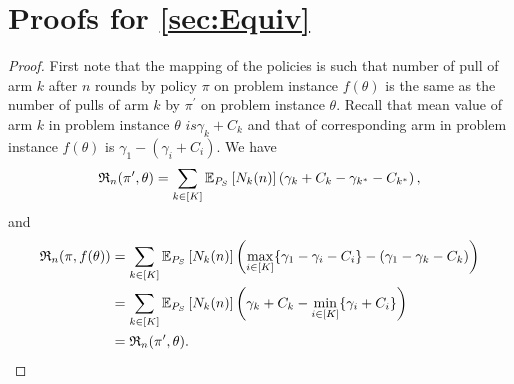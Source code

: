 \section{Proofs for \cref{sec:Equiv}}
\propEquivalence*
\begin{proof}First note that the mapping of the policies is such that number of pull of arm $k$ after $n$ rounds by policy $\pi$ on problem instance $f(\theta)$ is the same as the number of pulls of arm $k$ by $\pi^\prime$ on problem instance $\theta$. Recall that mean value of arm $k$ in problem instance $\theta$ $ is \gamma_k +C_k$ and that of corresponding arm in problem instance $f(\theta)$ is $\gamma_1-(\gamma_i+C_i)$. We have
	\begin{align*}
	\mathfrak{R}_n(\pi^\prime,\theta) = \sum_{k\in [K]} \mathbb{E}_{P_S}\left[N_k(n)\right](\gamma_k+C_k-\gamma_{k^*}-C_{k^*}) \,,
	\end{align*}
	and
	\begin{align*}
	 \mathfrak{R}_n(\pi,f(\theta))
	&= \sum_{k\in [K]} \mathbb{E}_{P_S}\left[N_k(n)\right]\left (\max_{i \in [K]}\{\gamma_1-\gamma_i- C_i\}-(\gamma_1-\gamma_k- C_k)\right) \\
	&= \sum_{k\in [K]} \mathbb{E}_{P_S}\left[N_k(n)\right]\left (\gamma_k+ C_k - \min_{i \in [K]}\{\gamma_i+ C_i\}\right) \\
	&=\mathfrak{R}_n(\pi^\prime,\theta).
	\end{align*}
	\end{proof}
